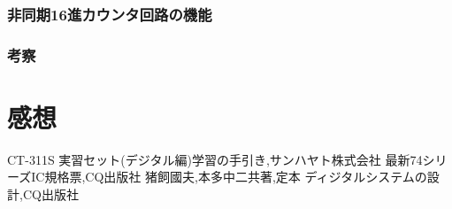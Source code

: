 \documentclass[twocolumn, 10pt,a4j]{jsarticle}
\begin{document}
  \subsubsection{非同期16進カウンタ回路の機能}
  \subsubsection{考察}
\section{感想}


\begin{thebibliography}{3}
\bibitem{}CT-311S 実習セット(デジタル編)学習の手引き,サンハヤト株式会社
\bibitem{}最新74シリーズIC規格票,CQ出版社
\bibitem{}猪飼國夫,本多中二共著,定本 ディジタルシステムの設計,CQ出版社
\end{thebibliography}
\end{document}
